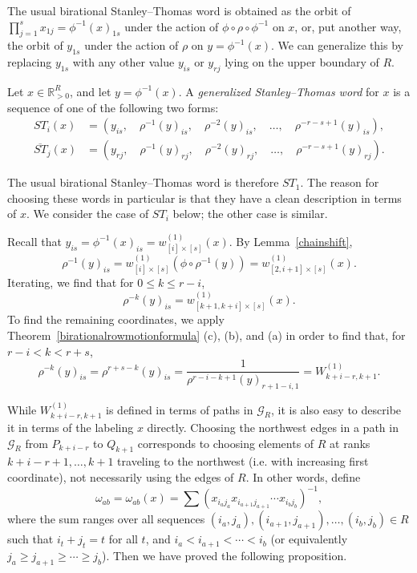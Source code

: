 \documentclass[ALCO,Unicode,published]{cedram}
\numberwithin{equation}{section}
\begin{document}
The usual birational Stanley--Thomas word is obtained as the orbit of $\prod_{j=1}^s x_{1j} = \phi^{-1}(x)_{1s}$ under the action of $\phi \circ \rho \circ \phi^{-1}$ on $x$, or, put another way, the orbit of $y_{1s}$ under the action of $\rho$ on $y=\phi^{-1}(x)$. We can generalize this by replacing $y_{1s}$ with any other value $y_{is}$ or $y_{rj}$ lying on the upper boundary of $R$.

\begin{Def}
Let $x \in \mathbb R^R_{>0}$, and let $y=\phi^{-1}(x)$. A \emph{generalized Stanley--Thomas word} for $x$ is a sequence of one of the following two forms:
\begin{align*}
    ST_{i}(x)&=(y_{is}, \quad \rho^{-1}(y)_{is}, \quad \rho^{-2}(y)_{is}, \quad \dots, \quad \rho^{-r-s+1}(y)_{is}),\\
    \overline{ST}_j(x)&=(y_{rj}, \quad \rho^{-1}(y)_{rj}, \quad \rho^{-2}(y)_{rj}, \quad \dots, \quad \rho^{-r-s+1}(y)_{rj}).
\end{align*}
\end{Def}

The usual birational Stanley--Thomas word is therefore $ST_{1}$. The reason for choosing these words in particular is that they have a clean description in terms of $x$. We consider the case of $ST_i$ below; the other case is similar.


Recall that $y_{is} = \phi^{-1}(x)_{is} = w^{(1)}_{[i]\times [s]}(x)$. By Lemma~\ref{chainshift}, 
\[\rho^{-1}(y)_{is} = w^{(1)}_{[i] \times [s]}(\phi \circ \rho^{-1}(y)) = w^{(1)}_{[2,i+1] \times [s]}(x).\]
Iterating, we find that for $0 \leq k \leq r-i$,
\[\rho^{-k}(y)_{is} = w^{(1)}_{[k+1,k+i] \times [s]}(x).\]
To find the remaining coordinates, we apply Theorem~\ref{birationalrowmotionformula} (c), (b), and (a) in order to find that, for $r-i<k<r+s$,
\[\rho^{-k}(y)_{is} = \rho^{r+s-k}(y)_{is} = \frac{1}{\rho^{r-i-k+1}(y)_{r+1-i,1}} = W_{k+i-r,k+1}^{(1)}.\]

While $W_{k+i-r,k+1}^{(1)}$ is defined in terms of paths in $\mathcal G_R$, it is also easy to describe it in terms of the labeling $x$ directly. Choosing the northwest edges in a path in $\mathcal G_R$ from $P_{k+i-r}$ to $Q_{k+1}$ corresponds to choosing elements of $R$ at ranks $k+i-r+1,\dots, k+1$ traveling to the northwest (i.e. with increasing first coordinate), not necessarily using the edges of $R$. In other words, define
\[\omega_{ab} = \omega_{ab}(x) = \sum (x_{i_aj_a}x_{i_{a+1}j_{a+1}} \cdots x_{i_bj_b})^{-1},\]
where the sum ranges over all sequences $(i_a,j_a), (i_{a+1},j_{a+1}), \dots, (i_b,j_b) \in R$ such that $i_t+j_t = t$ for all $t$, and $i_a < i_{a+1} < \cdots < i_b$ (or equivalently $j_a \geq j_{a+1} \geq \cdots \geq j_b$). Then we have proved the following proposition.
\end{document}
